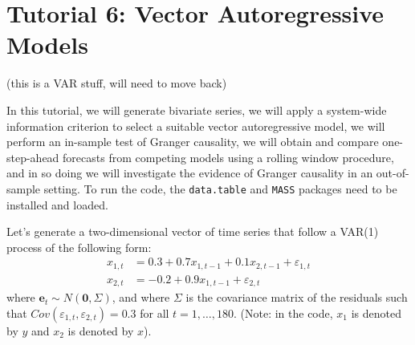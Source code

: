 \documentclass[
  12pt,
  oneside]{book}
\begin{document}
\hypertarget{tutorial-6-vector-autoregressive-models}{%
\chapter*{Tutorial 6: Vector Autoregressive Models}\label{tutorial-6-vector-autoregressive-models}}

(this is a VAR stuff, will need to move back)

In this tutorial, we will generate bivariate series, we will apply a system-wide information criterion to select a suitable vector autoregressive model, we will perform an in-sample test of Granger causality, we will obtain and compare one-step-ahead forecasts from competing models using a rolling window procedure, and in so doing we will investigate the evidence of Granger causality in an out-of-sample setting. To run the code, the \texttt{data.table} and \texttt{MASS} packages need to be installed and loaded.

Let's generate a two-dimensional vector of time series that follow a VAR(1) process of the following form: \[\begin{aligned}
x_{1,t} &= 0.3 + 0.7x_{1,t-1} + 0.1x_{2,t-1} + \varepsilon_{1,t} \\
x_{2,t} &= -0.2 + 0.9x_{1,t-1} + \varepsilon_{2,t}
\end{aligned}\] where \(\mathbf{e}_{t} \sim N(\mathbf{0},\Sigma)\), and where \(\Sigma\) is the covariance matrix of the residuals such that \(Cov(\varepsilon_{1,t},\varepsilon_{2,t}) = 0.3\) for all \(t=1,\ldots,180\). (Note: in the code, \(x_1\) is denoted by \(y\) and \(x_2\) is denoted by \(x\)).
\end{document}
